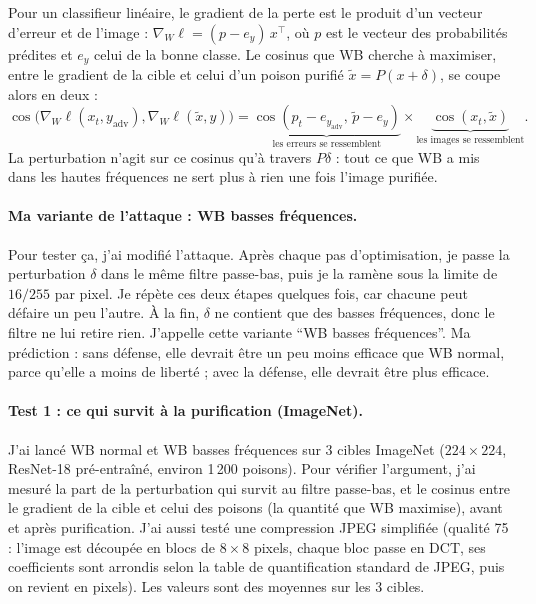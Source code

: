 Pour un classifieur linéaire, le gradient de la perte est le produit d'un
vecteur d'erreur et de l'image : $\nabla_W\ell=(p-e_y)\,x^\top$, où $p$
est le vecteur des probabilités prédites et $e_y$ celui de la bonne
classe. Le cosinus que WB cherche à maximiser, entre le gradient de la
cible et celui d'un poison purifié $\tilde x=P(x+\delta)$, se coupe alors
en deux :
\[
\cos\big(\nabla_W\ell(x_t,y_{\mathrm{adv}}),\nabla_W\ell(\tilde x,y)\big)
=\underbrace{\cos(p_t-e_{y_{\mathrm{adv}}},\,\tilde p-e_y)}_{\text{les erreurs se ressemblent}}
\times\underbrace{\cos(x_t,\tilde x)}_{\text{les images se ressemblent}} .
\]
La perturbation n'agit sur ce cosinus qu'à travers $P\delta$ : tout ce
que WB a mis dans les hautes fréquences ne sert plus à rien une fois
l'image purifiée.

\paragraph{Ma variante de l'attaque : WB basses fréquences.}
Pour tester ça, j'ai modifié l'attaque. Après chaque pas d'optimisation,
je passe la perturbation $\delta$ dans le même filtre passe-bas, puis je
la ramène sous la limite de $16/255$ par pixel. Je répète ces deux étapes
quelques fois, car chacune peut défaire un peu l'autre. À la fin,
$\delta$ ne contient que des basses fréquences, donc le filtre ne lui
retire rien. J'appelle cette variante ``WB basses fréquences''.
Ma prédiction : sans défense, elle devrait être un peu moins efficace que
WB normal, parce qu'elle a moins de liberté ; avec la défense, elle
devrait être plus efficace.

\paragraph{Test 1 : ce qui survit à la purification (ImageNet).}
J'ai lancé WB normal et WB basses fréquences sur 3 cibles ImageNet
($224\times224$, ResNet-18 pré-entraîné, environ 1\,200 poisons). Pour
vérifier l'argument, j'ai mesuré la part de la perturbation qui survit au
filtre passe-bas, et le cosinus entre le gradient de la cible et celui des
poisons (la quantité que WB maximise), avant et après purification.
J'ai aussi testé une compression JPEG simplifiée (qualité 75 : l'image
est découpée en blocs de $8\times8$ pixels, chaque bloc passe en DCT, ses
coefficients sont arrondis selon la table de quantification standard de
JPEG, puis on revient en pixels). Les valeurs sont des moyennes sur les
3 cibles.

